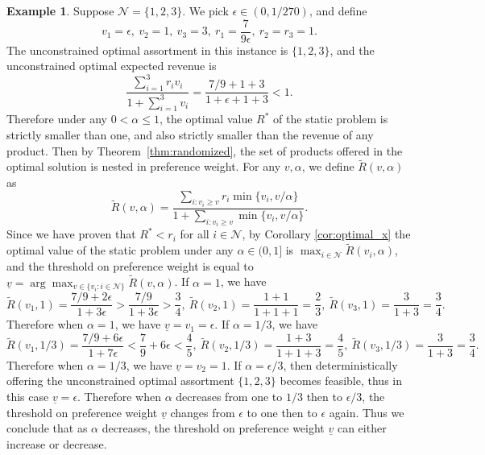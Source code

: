 \documentclass[mnsc,non-blindrev]{informs3}
\theoremstyle{definition}
\newtheorem{example}[theorem]{Example}
\begin{document}
\begin{example}
Suppose $\mathcal{N}=\{1,2,3\}$. We pick $\epsilon\in(0,1/270)$, and define
\begin{equation*}
v_1=\epsilon,\ v_2=1,\ v_3=3,\ r_1=\dfrac{7}{9\epsilon},\ r_2=r_3=1.
\end{equation*}
The unconstrained optimal assortment in this instance is $\{1,2,3\}$, and the unconstrained optimal expected revenue is
\begin{equation*}
\dfrac{\sum_{i=1}^3 r_iv_i}{1+\sum_{i=1}^3 v_i}=\dfrac{7/9+1+3}{1+\epsilon+1+3}<1.
\end{equation*}
Therefore under any $0<\alpha\leq 1$, the optimal value $R^*$ of the static problem is strictly smaller than one, and also strictly smaller than the revenue of any product. Then by Theorem~\ref{thm:randomized}, the set of products offered in the optimal solution is nested in preference weight. For any $v,\alpha$, we define $\tilde{R}(v,\alpha)$ as
\begin{equation*}
\tilde{R}(v,\alpha)=\dfrac{\sum_{i:v_i\geq v}r_i\min\{v_i,v/\alpha\}}{1+\sum_{i:v_i\geq v}\min\{v_i,v/\alpha\}}.
\end{equation*}
Since we have proven that $R^*<r_i$ for all $i\in\mathcal{N}$, by Corollary \ref{cor:optimal_x} the optimal value of the static problem under any $\alpha\in(0,1]$ is $\max_{i\in\mathcal{N}}\tilde{R}(v_i,\alpha)$, and the threshold on preference weight is equal to $\underline{v}=\arg\max_{v\in\{v_i:i\in\mathcal{N}\}}\tilde{R}(v,\alpha)$. If $\alpha=1$, we have
\begin{equation*}
\tilde{R}(v_1,1)=\dfrac{7/9+2\epsilon}{1+3\epsilon}>\dfrac{7/9}{1+3\epsilon}>\dfrac{3}{4},\ \tilde{R}(v_2,1)=\dfrac{1+1}{1+1+1}=\dfrac{2}{3},\ \tilde{R}(v_3,1)=\dfrac{3}{1+3}=\dfrac{3}{4}.
\end{equation*}
Therefore when $\alpha=1$, we have $\underline{v}=v_1=\epsilon$. If $\alpha=1/3$, we have
\begin{equation*}
\tilde{R}(v_1,1/3)=\dfrac{7/9+6\epsilon}{1+7\epsilon}<\dfrac{7}{9}+6\epsilon<\dfrac{4}{5},\ \tilde{R}(v_2,1/3)=\dfrac{1+3}{1+1+3}=\dfrac{4}{5},\ \tilde{R}(v_3,1/3)=\dfrac{3}{1+3}=\dfrac{3}{4}.
\end{equation*}
Therefore when $\alpha=1/3$, we have $\underline{v}=v_2=1$. If $\alpha=\epsilon/3$, then deterministically offering the unconstrained optimal assortment $\{1,2,3\}$ becomes feasible, thus in this case $\underline{v}=\epsilon$. Therefore when $\alpha$ decreases from one to $1/3$ then to $\epsilon/3$, the threshold on preference weight $\underline{v}$ changes from $\epsilon$ to one then to $\epsilon$ again. Thus we conclude that as $\alpha$ decreases, the threshold on preference weight $\underline{v}$ can either increase or decrease.
\end{example}
\end{document}
